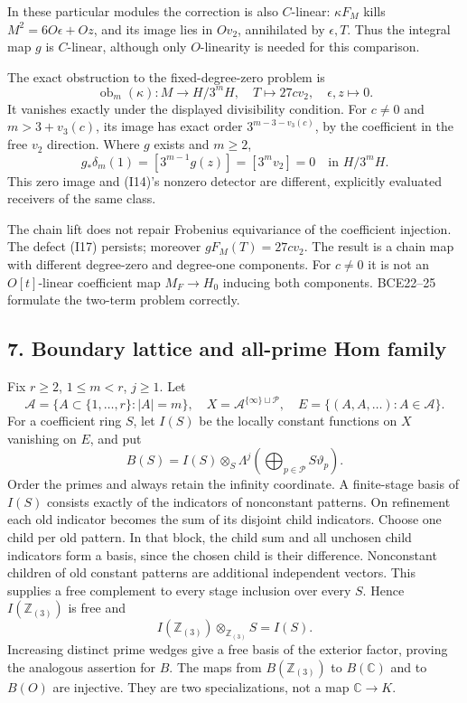 \documentclass[
  10pt,
]{article}
\begin{document}
In these particular modules the correction is also \(C\)-linear:
\(\kappa F_M\) kills \(M^2=6O\epsilon+Oz\), and its image lies in
\(Ov_2\), annihilated by \(\epsilon,T\). Thus the integral map \(g\) is
\(C\)-linear, although only \(O\)-linearity is needed for this
comparison.

The exact obstruction to the fixed-degree-zero problem is \[
\operatorname{ob}_m(\kappa):M\to H/3^mH,\quad
T\mapsto27cv_2,\quad\epsilon,z\mapsto0. \tag{I20}
\] It vanishes exactly under the displayed divisibility condition. For
\(c\ne0\) and \(m>3+v_3(c)\), its image has exact order
\(3^{m-3-v_3(c)}\), by the coefficient in the free \(v_2\) direction.
Where \(g\) exists and \(m\ge2\), \[
g_*\delta_m(1)=[3^{m-1}g(z)]=[3^mv_2]=0
\quad\text{in }H/3^mH. \tag{I21}
\] This zero image and (I14)'s nonzero detector are different,
explicitly evaluated receivers of the same class.

The chain lift does not repair Frobenius equivariance of the coefficient
injection. The defect (I17) persists; moreover \(gF_M(T)=27cv_2\). The
result is a chain map with different degree-zero and degree-one
components. For \(c\ne0\) it is not an \(O[t]\)-linear coefficient map
\(M_F\to H_0\) inducing both components. BCE22--25 formulate the
two-term problem correctly.

\subsection{7. Boundary lattice and all-prime Hom
family}\label{boundary-lattice-and-all-prime-hom-family}

Fix \(r\ge2\), \(1\le m<r\), \(j\ge1\). Let \[
\mathcal A=\{A\subset\{1,\ldots,r\}:|A|=m\},\quad
X=\mathcal A^{\{\infty\}\sqcup\mathcal P},\quad
E=\{(A,A,\ldots):A\in\mathcal A\}.
\] For a coefficient ring \(S\), let \(I(S)\) be the locally constant
functions on \(X\) vanishing on \(E\), and put \[
B(S)=I(S)\otimes_S
\Lambda^j\left(\bigoplus_{p\in\mathcal P}S\vartheta_p\right).
\] Order the primes and always retain the infinity coordinate. A
finite-stage basis of \(I(S)\) consists exactly of the indicators of
nonconstant patterns. On refinement each old indicator becomes the sum
of its disjoint child indicators. Choose one child per old pattern. In
that block, the child sum and all unchosen child indicators form a
basis, since the chosen child is their difference. Nonconstant children
of old constant patterns are additional independent vectors. This
supplies a free complement to every stage inclusion over every \(S\).
Hence \(I(\mathbb Z_{(3)})\) is free and \[
I(\mathbb Z_{(3)})\otimes_{\mathbb Z_{(3)}}S=I(S).
\] Increasing distinct prime wedges give a free basis of the exterior
factor, proving the analogous assertion for \(B\). The maps from
\(B(\mathbb Z_{(3)})\) to \(B(\mathbb C)\) and to \(B(O)\) are
injective. They are two specializations, not a map \(\mathbb C\to K\).
\end{document}
